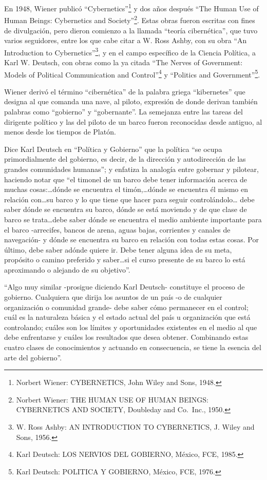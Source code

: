 \documentclass[
]{book}
\begin{document}
En 1948, Wiener publicó ``Cybernetics''\footnote{Norbert Wiener: CYBERNETICS, John Wiley and Sons, 1948.} y dos años después ``The Human Use of Human Beings: Cybernetics and Society''\footnote{Norbert Wiener: THE HUMAN USE OF HUMAN BEINGS: CYBERNETICS AND SOCIETY, Doubleday and Co.~Inc., 1950.}. Estas obras fueron escritas con fines de divulgación, pero dieron comienzo a la llamada ``teoría cibernética'', que tuvo varios seguidores, entre los que cabe citar a W. Ross Ashby, con su obra ``An Introduction to Cybernetics''\footnote{W. Ross Ashby: AN INTRODUCTION TO CYBERNETICS, J. Wiley and Sons, 1956.}, y en el campo específico de la Ciencia Política, a Karl W. Deutsch, con obras como la ya citada ``The Nerves of Government: Models of Political Communication and Control''\footnote{ Karl Deutsch: LOS NERVIOS DEL GOBIERNO, México, FCE, 1985.} y ``Politics and Government''\footnote{Karl Deutsch: POLITICA Y GOBIERNO, México, FCE, 1976.}.

Wiener derivó el término ``cibernética'' de la palabra griega ``kibernetes'' que designa al que comanda una nave, al piloto, expresión de donde derivan también palabras como ``gobierno'' y ``gobernante''. La semejanza entre las tareas del dirigente político y las del piloto de un barco fueron reconocidas desde antiguo, al menos desde los tiempos de Platón.

Dice Karl Deutsch en ``Política y Gobierno'' que la política ``se ocupa primordialmente del gobierno, es decir, de la dirección y autodirección de las grandes comunidades humanas''; y enfatiza la analogía entre gobernar y pilotear, haciendo notar que ``el timonel de un barco debe tener información acerca de muchas cosas:\ldots dónde se encuentra el timón,\ldots dónde se encuentra él mismo en relación con\ldots su barco y lo que tiene que hacer para seguir controlándolo\ldots{} debe saber dónde se encuentra su barco, dónde se está moviendo y de que clase de barco se trata\ldots debe saber dónde se encuentra el medio ambiente importante para el barco -arrecifes, bancos de arena, aguas bajas, corrientes y canales de navegación- y dónde se encuentra su barco en relación con todas estas cosas. Por último, debe saber adónde quiere ir. Debe tener alguna idea de su meta, propósito o camino preferido y saber\ldots si el curso presente de su barco lo está aproximando o alejando de su objetivo''.

``Algo muy similar -prosigue diciendo Karl Deutsch- constituye el proceso de gobierno. Cualquiera que dirija los asuntos de un país -o de cualquier organización o comunidad grande- debe saber cómo permanecer en el control; cuál es la naturaleza básica y el estado actual del país u organización que está controlando; cuáles son los límites y oportunidades existentes en el medio al que debe enfrentarse y cuáles los resultados que desea obtener. Combinando estas cuatro clases de conocimientos y actuando en consecuencia, se tiene la esencia del arte del gobierno''.
\end{document}
